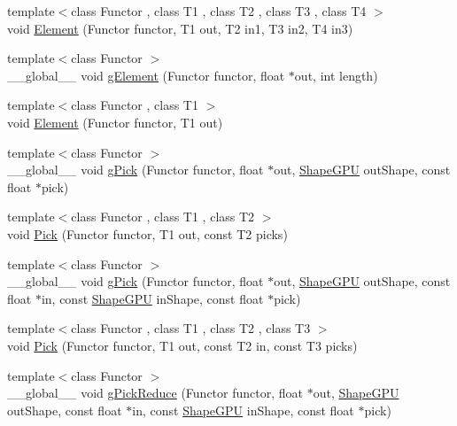 \begin{DoxyCompactItemize}
\item 
{\footnotesize template$<$class Functor , class T1 , class T2 , class T3 , class T4 $>$ }\\void \hyperlink{namespacemarian_a108cae15db18ddbf2e345484d3b85eb8}{Element} (Functor functor, T1 out, T2 in1, T3 in2, T4 in3)
\item 
{\footnotesize template$<$class Functor $>$ }\\\+\_\+\+\_\+global\+\_\+\+\_\+ void \hyperlink{namespacemarian_a61526f5441180f474625a4f7af62172c}{g\+Element} (Functor functor, float $\ast$out, int length)
\item 
{\footnotesize template$<$class Functor , class T1 $>$ }\\void \hyperlink{namespacemarian_adcc096ade4f61f451e668c08ff52a924}{Element} (Functor functor, T1 out)
\item 
{\footnotesize template$<$class Functor $>$ }\\\+\_\+\+\_\+global\+\_\+\+\_\+ void \hyperlink{namespacemarian_a10cae6ac3354fc0097e75cbbba277323}{g\+Pick} (Functor functor, float $\ast$out, \hyperlink{structmarian_1_1ShapeGPU}{Shape\+G\+PU} out\+Shape, const float $\ast$pick)
\item 
{\footnotesize template$<$class Functor , class T1 , class T2 $>$ }\\void \hyperlink{namespacemarian_af4c11b5776ff838d3db3d228336802fd}{Pick} (Functor functor, T1 out, const T2 picks)
\item 
{\footnotesize template$<$class Functor $>$ }\\\+\_\+\+\_\+global\+\_\+\+\_\+ void \hyperlink{namespacemarian_aaa967e002381c4e5cce7a7c12d758347}{g\+Pick} (Functor functor, float $\ast$out, \hyperlink{structmarian_1_1ShapeGPU}{Shape\+G\+PU} out\+Shape, const float $\ast$in, const \hyperlink{structmarian_1_1ShapeGPU}{Shape\+G\+PU} in\+Shape, const float $\ast$pick)
\item 
{\footnotesize template$<$class Functor , class T1 , class T2 , class T3 $>$ }\\void \hyperlink{namespacemarian_aaad2bafac169bc8b4de2364bd9a228cb}{Pick} (Functor functor, T1 out, const T2 in, const T3 picks)
\item 
{\footnotesize template$<$class Functor $>$ }\\\+\_\+\+\_\+global\+\_\+\+\_\+ void \hyperlink{namespacemarian_ababfcb483a7f3ca788a8b2d58f30cc9d}{g\+Pick\+Reduce} (Functor functor, float $\ast$out, \hyperlink{structmarian_1_1ShapeGPU}{Shape\+G\+PU} out\+Shape, const float $\ast$in, const \hyperlink{structmarian_1_1ShapeGPU}{Shape\+G\+PU} in\+Shape, const float $\ast$pick)

\end{DoxyCompactItemize}
